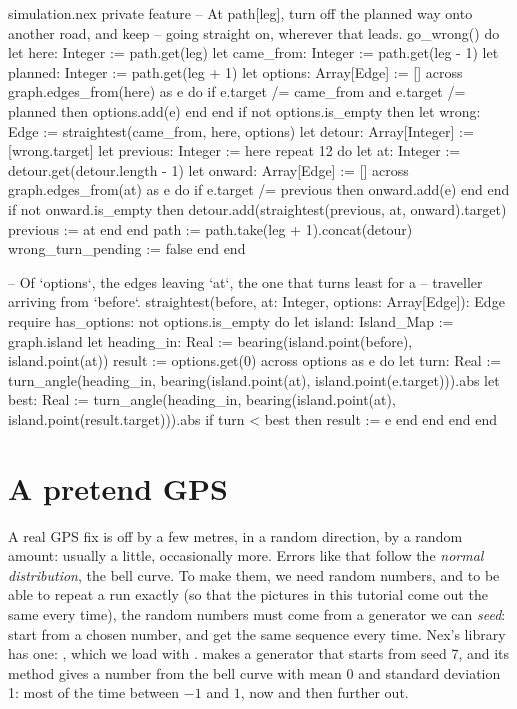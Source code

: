 \begin{continued}{simulation.nex}
private feature
  -- At path[leg], turn off the planned way onto another road, and keep
  -- going straight on, wherever that leads.
  go_wrong() do
    let here: Integer := path.get(leg)
    let came_from: Integer := path.get(leg - 1)
    let planned: Integer := path.get(leg + 1)
    let options: Array[Edge] := []
    across graph.edges_from(here) as e do
      if e.target /= came_from and e.target /= planned then
        options.add(e)
      end
    end
    if not options.is_empty then
      let wrong: Edge := straightest(came_from, here, options)
      let detour: Array[Integer] := [wrong.target]
      let previous: Integer := here
      repeat 12 do
        let at: Integer := detour.get(detour.length - 1)
        let onward: Array[Edge] := []
        across graph.edges_from(at) as e do
          if e.target /= previous then
            onward.add(e)
          end
        end
        if not onward.is_empty then
          detour.add(straightest(previous, at, onward).target)
          previous := at
        end
      end
      path := path.take(leg + 1).concat(detour)
      wrong_turn_pending := false
    end
  end

  -- Of `options`, the edges leaving `at`, the one that turns least for a
  -- traveller arriving from `before`.
  straightest(before, at: Integer, options: Array[Edge]): Edge
  require
    has_options: not options.is_empty
  do
    let island: Island_Map := graph.island
    let heading_in: Real := bearing(island.point(before), island.point(at))
    result := options.get(0)
    across options as e do
      let turn: Real := turn_angle(heading_in, bearing(island.point(at), island.point(e.target))).abs
      let best: Real := turn_angle(heading_in, bearing(island.point(at),
        island.point(result.target))).abs
      if turn < best then
        result := e
      end
    end
  end
end
\end{continued}

\section{A pretend GPS}

A real GPS fix is off by a few metres, in a random direction, by a random
amount: usually a little, occasionally more. Errors like that follow the
\emph{normal distribution}, the bell curve. To make them, we need random
numbers, and to be able to repeat a run exactly (so that the pictures in
this tutorial come out the same every time), the random numbers must come
from a generator we can \emph{seed}: start from a chosen number, and get
the same sequence every time.
Nex's library has one: , which we load with
.  makes a
generator that starts from seed 7, and its  method gives a
number from the bell curve with mean 0 and standard deviation 1: most of
the time between $-1$ and $1$, now and then further out.


